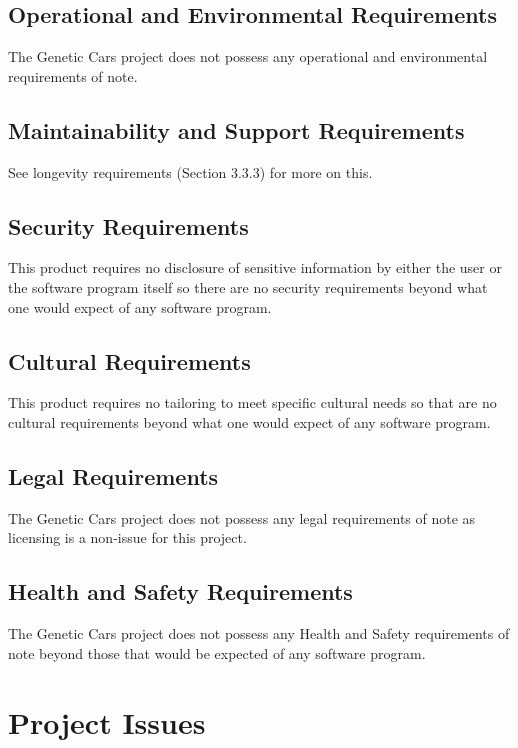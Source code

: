 \documentclass[12pt, titlepage]{article}
\begin{document}
\subsection{Operational and Environmental Requirements}

The Genetic Cars project does not possess any operational and environmental 
requirements of note.

\subsection{Maintainability and Support Requirements}

See longevity requirements (Section 3.3.3) for more on this.

\subsection{Security Requirements}

This product requires no disclosure of sensitive information by either the user 
or the software program itself so there are no security requirements beyond what 
one would expect of any software program.

\subsection{Cultural Requirements}

This product requires no tailoring to meet specific cultural needs so that are 
no cultural requirements beyond what one would expect of any software program.

\subsection{Legal Requirements}

The Genetic Cars project does not possess any legal requirements of note as 
licensing is a non-issue for this project.

\subsection{Health and Safety Requirements}

The Genetic Cars project does not possess any Health and Safety requirements of 
note beyond those that would be expected of any software program.
\section{Project Issues}
\end{document}
